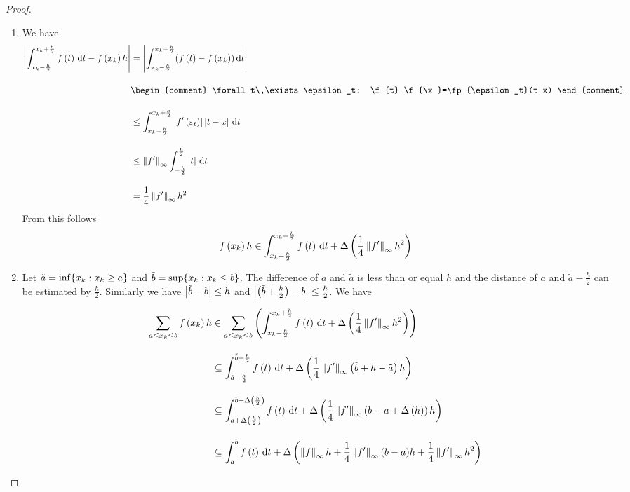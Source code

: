 \begin{proof}~
  \begin{enumerate}
    \item We have
      \begin{align}
        \abs{\int_{\x-\frac h2}^{\x+\frac h2} \f{t} \d{t} - \f{\x} h} &= \abs{\int_{\x-\frac h2}^{\x+\frac h2} (\f{t}-\f{\x}) \d{t}} \bnl
        &
        \begin{comment}
          \forall t\,\exists \epsilon_t: \f{t}-\f{\x}=\fp{\epsilon_t}(t-x)
        \end{comment} \bnl
        & \le \int_{\x-\frac h2}^{\x+\frac h2} \abs{\fp{\epsilon_t}} \abs{t-x} \d{t} \bnl
        & \le \snorm{f'} \int_{-\frac h2}^{\frac h2} \abs{t} \d{t} \bnl
        & = \frac 14 \snorm{f'} h^2
      \end{align}
      From this follows
      \begin{align}
        f\left({x_{k}}\right) h \in \int_{x_{k}-\frac h2}^{x_{k}+\frac h2} f\left({t}\right) \,\mathrm d{t} + \Delta\left( {\frac 14 \left\|{f'}\right\|_\infty h^2} \right)
      \end{align}

    \item Let $\tilde a = \inf \{ x_{k} : x_{k} \ge a \}$ and $\tilde b = \sup \{ x_{k} : x_{k} \le b \}$. The difference of $a$ and $\tilde a$ is less than or equal $h$ and the distance of $a$ and $\tilde a - \frac h2$ can be estimated by $\frac h2$. Similarly we have $\left|{\tilde b-b}\right| \le h$ and $\left|{\left( {\tilde b+\frac h2} \right)-b}\right| \le \frac h2$. We have

      \begin{align}
        \sum_{a \le \x \le b} \f{\x} h & \in \sum_{a\le \x\le b} \br{\int_{\x-\frac h2}^{\x+\frac h2} \f{t} \d{t} + \bigabs{\frac 14 \snorm{f'} h^2}} \bnl
        & \subseteq \int_{\tilde a - \frac h2}^{\tilde b + \frac h2} \f{t} \d{t} + \bigabs{\frac 14 \snorm{f'}\br{\tilde b + h - \tilde a} h}\bnl
        & \subseteq \int_{a+\bigabs{\frac h2}}^{b+\bigabs{\frac h2}} \f{t} \d{t} + \bigabs{\frac 14\snorm{f'}\br{b-a+\bigabs{h}} h}\bnl
        & \subseteq \int_a^b \f{t} \d{t} + \bigabs{\snorm{f}h + \frac 14 \snorm{f'} (b-a) h + \frac 14 \snorm{f'} h^2}
      \end{align}

  \end{enumerate}
\end{proof}

